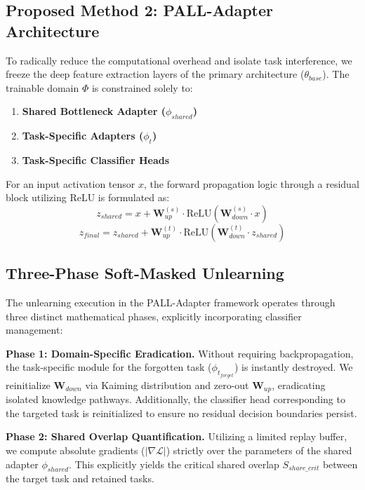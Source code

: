 \documentclass[conference]{IEEEtran}
\theoremstyle{plain}
\theoremstyle{definition}
\theoremstyle{remark}
\begin{document}
\subsection{Proposed Method 2: PALL-Adapter Architecture}
To radically reduce the computational overhead and isolate task interference, we freeze the deep feature extraction layers of the primary architecture (\(\theta_{base}\)). The trainable domain \(\Phi\) is constrained solely to:
\begin{enumerate}
    \item \textbf{Shared Bottleneck Adapter (\(\phi_{shared}\))}
    \item \textbf{Task-Specific Adapters (\(\phi_{t}\))}
    \item \textbf{Task-Specific Classifier Heads}
\end{enumerate}

For an input activation tensor \(x\), the forward propagation logic through a residual block utilizing ReLU \cite{nair2010relu} is formulated as:
\begin{equation}
z_{shared} = x + \mathbf{W}_{up}^{(s)} \cdot \text{ReLU}\left(\mathbf{W}_{down}^{(s)} \cdot x\right)
\end{equation}
\begin{equation}
z_{final} = z_{shared} + \mathbf{W}_{up}^{(t)} \cdot \text{ReLU}\left(\mathbf{W}_{down}^{(t)} \cdot z_{shared}\right)
\end{equation}

\subsection{Three-Phase Soft-Masked Unlearning}
The unlearning execution in the PALL-Adapter framework operates through three distinct mathematical phases, explicitly incorporating classifier management:

\textbf{Phase 1: Domain-Specific Eradication.} Without requiring backpropagation, the task-specific module for the forgotten task (\(\phi_{t_{forget}}\)) is instantly destroyed. We reinitialize \(\mathbf{W}_{down}\) via Kaiming distribution \cite{he2015delving} and zero-out \(\mathbf{W}_{up}\), eradicating isolated knowledge pathways. Additionally, the classifier head corresponding to the targeted task is reinitialized to ensure no residual decision boundaries persist.

\textbf{Phase 2: Shared Overlap Quantification.} Utilizing a limited replay buffer, we compute absolute gradients (\(|\nabla \mathcal{L}|\)) strictly over the parameters of the shared adapter \(\phi_{shared}\). This explicitly yields the critical shared overlap \(S_{share\_crit}\) between the target task and retained tasks.
\end{document}
